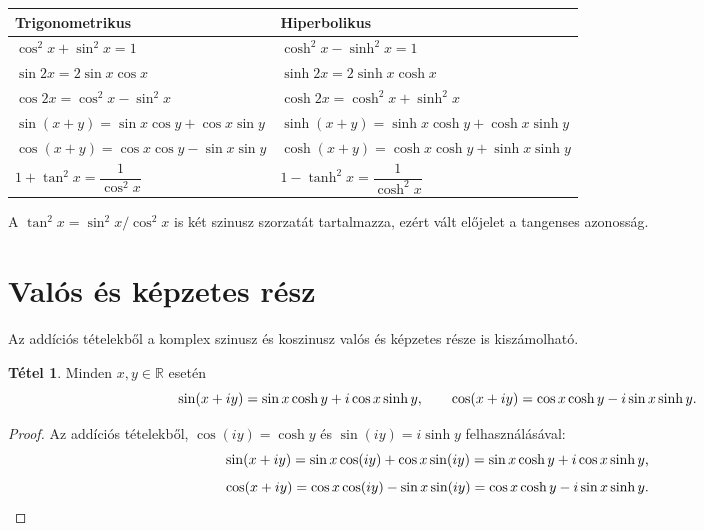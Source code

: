 \documentclass[11pt]{scrartcl}
\theoremstyle{definition}
\newtheorem{theorem}[definition]{Tétel}
\theoremstyle{remark}
\begin{document}
\begin{center}
	\renewcommand{\arraystretch}{1.7}
	\begin{tabular}{@{}ll@{}}
		\toprule
		Trigonometrikus                               & Hiperbolikus \\
		\midrule
		$\cos^2 x + \sin^2 x = 1$                     &
		$\cosh^2 x - \sinh^2 x = 1$                                  \\
		$\sin 2x = 2 \sin x \cos x$                   &
		$\sinh 2x = 2 \sinh x \cosh x$                               \\
		$\cos 2x = \cos^2 x - \sin^2 x$               &
		$\cosh 2x = \cosh^2 x + \sinh^2 x$                           \\
		$\sin(x + y) = \sin x \cos y + \cos x \sin y$ &
		$\sinh(x + y) = \sinh x \cosh y + \cosh x \sinh y$           \\
		$\cos(x + y) = \cos x \cos y - \sin x \sin y$ &
		$\cosh(x + y) = \cosh x \cosh y + \sinh x \sinh y$           \\
		$1 + \tan^2 x = \dfrac{1}{\cos^2 x}$                   &
		$1 - \tanh^2 x = \dfrac{1}{\cosh^2 x}$                                \\
		\bottomrule
	\end{tabular}
\end{center}

A $\tan^2 x = \sin^2 x/\cos^2 x$ is két szinusz szorzatát tartalmazza,
ezért vált előjelet a tangenses azonosság.

\section{Valós és képzetes rész}

Az addíciós tételekből a komplex szinusz és koszinusz valós és képzetes része
is kiszámolható.

\begin{theorem}
	Minden $x, y \in \mathbb{R}$ esetén
	\[
		\sin(x + iy) = \sin x \cosh y + i \cos x \sinh y, \qquad
		\cos(x + iy) = \cos x \cosh y - i \sin x \sinh y\text.
	\]
\end{theorem}

\begin{proof}
	Az addíciós tételekből, $\cos(iy) = \cosh y$ és $\sin(iy) = i \sinh y$
	felhasználásával:
	\[
		\sin(x + iy) = \sin x \cos(iy) + \cos x \sin(iy)
		= \sin x \cosh y + i \cos x \sinh y\text,
	\]
	\[
		\cos(x + iy) = \cos x \cos(iy) - \sin x \sin(iy)
		= \cos x \cosh y - i \sin x \sinh y\text.
	\]
\end{proof}
\end{document}
